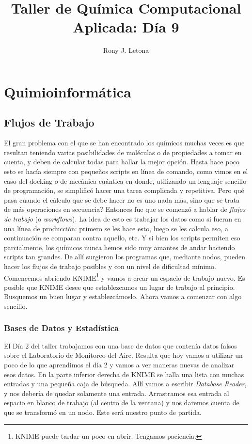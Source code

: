 \documentclass[10pt,letterpaper]{article}
\author{Rony J. Letona}
\title{Taller de Qu\'imica Computacional Aplicada: D\'ia 9}
\begin{document}
\maketitle

\section{Quimioinform\'atica}


\subsection{Flujos de Trabajo}
El gran problema con el que se han encontrado los qu\'imicos muchas veces es que resultan teniendo varias posibilidades de mol\'eculas o de propiedades a tomar en cuenta, y deben de calcular todas para hallar la mejor opci\'on. Hasta hace poco esto se hac\'ia siempre con peque\~nos scripts en l\'inea de comando, como vimos en el caso del docking o de mec\'anica cu\'antica en donde, utilizando un lenguaje sencillo de programaci\'on, se simplific\'o hacer una tarea complicada y repetitiva. Pero qu\'e pasa cuando el c\'alculo que se debe hacer no es uno nada m\'as, sino que se trata de m\'as operaciones en secuencia? Entonces fue que se comenz\'o a hablar de \emph{flujos de trabajo} (o \emph{workflows}). La idea de esto es trabajar los datos como si fueran en una l\'inea de producci\'on: primero se les hace esto, luego se les calcula eso, a continuaci\'on se comparan contra aquello, etc. Y si bien los scripts permiten eso parcialmente, los qu\'imicos nunca hemos sido muy amantes de andar haciendo scripts tan grandes. De all\'i surgieron los programas que, mediante nodos, pueden hacer los flujos de trabajo posibles y con un nivel de dificultad m\'inimo.\\

Comencemos abriendo KNIME\footnote{KNIME puede tardar un poco en abrir. Tengamos paciencia.} y vamos a crear un espacio de trabajo nuevo. Es posible que KNIME desee que establezcamos un lugar de trabajo al principio. Busquemos un buen lugar y establezc\'amoslo. Ahora vamos a comenzar con algo sencillo.

\subsubsection{Bases de Datos y Estad\'istica}

El D\'ia 2 del taller trabajamos con una base de datos que conten\'ia datos falsos sobre el Laboratorio de Monitoreo del Aire. Resulta que hoy vamos a utilizar un poco de lo que aprendimos el d\'ia 2 y vamos a ver maneras nuevas de analizar esos datos. En la parte inferior derecha de KNIME se halla una lista con muchas entradas y una peque\~na caja de b\'usqueda. All\'i vamos a escribir \emph{Database Reader}, y nos deber\'ia de quedar solamente una entrada. Arrastramos esa entrada al espacio en blanco de trabajo (al centro de la ventana) y nos daremos cuenta de que se transform\'o en un nodo. Este ser\'a nuestro punto de partida.\\
\end{document}
